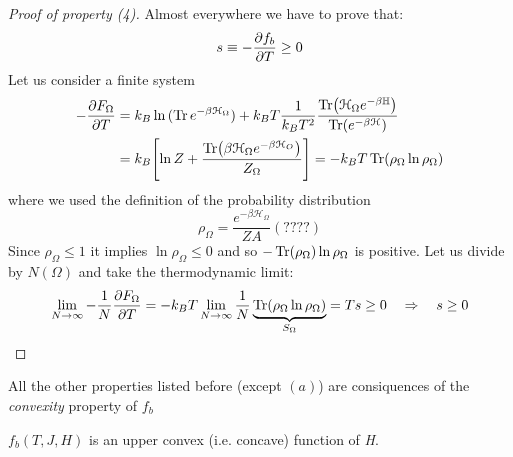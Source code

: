 \documentclass[../main/main.tex]{subfiles}
\begin{document}
\begin{proof} [Proof of property (4)]
  Almost everywhere we have to prove that:
  \begin{equation}
    s \equiv - \pdv{f_b}{T} \ge 0
  \end{equation}
  Let us consider a finite system
  \begin{equation}
  \begin{split}
  - \pdv{F_ \Omega }{T}   &= k_B \ln{(\Tr e^{- \beta \mathcal{H}_ \Omega }  )} + k_B T \frac{1}{k_B T^2} \frac{\Tr(\mathcal{H}_ \Omega  e^{-\beta \mathbb{H}} ) }{\Tr(e^{- \beta \mathcal{H}} ) } \\
  &= k_B \qty[\ln{Z} + \frac{\Tr(\beta \mathcal{H}_ \Omega e^{-\beta \mathcal{H}_ O
  } ) }{Z_ \Omega } ] =  - k_B T \Tr(\rho _ \Omega  \ln{\rho _ \Omega } )
  \end{split}
  \end{equation}
  where  we used the definition of the probability distribution
  \begin{equation}
    \rho _ \Omega  = \frac{e^{-\beta \mathcal{H}_ \Omega } }{Z A } (????)
  \end{equation}
  Since \( \rho _ \Omega \le 1 \) it implies \( \ln{\rho _ \Omega } \le 0  \) and so \( - \Tr(\rho _ \Omega ) \ln{\rho _ \Omega }   \) is positive. Let us divide by \( N (\Omega ) \) and take the thermodynamic limit:
  \begin{equation}
  \lim_{N \rightarrow \infty } - \frac{1}{N} \pdv{F_ \Omega }{T}   = - k_B T  \lim_{N \rightarrow \infty }  \frac{1}{N}  \underbrace{\Tr(\rho _ \Omega  \ln{\rho _ \Omega })}_{S _ \Omega }  = T s \ge 0  \quad \Rightarrow \quad s \ge 0
  \end{equation}
\end{proof}
All the other properties listed before (except \( (a) \)) are consiquences of the \emph{convexity} property of \( f_b \)
\begin{theorem}[]
\( f_b  (T,J,H)\) is an upper convex (i.e. concave) function of \emph{H}.
\end{theorem}
\end{document}
